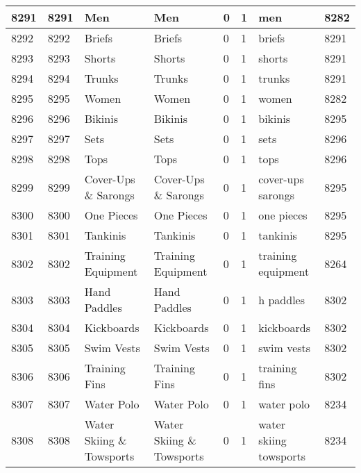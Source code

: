\begin{longtable}{|l|l|l|l|l|l|l|l|}
8291 & 8291 & Men & Men & 0 & 1 & men & 8282 \\ \hline 
8292 & 8292 & Briefs & Briefs & 0 & 1 & briefs & 8291 \\ \hline 
8293 & 8293 & Shorts & Shorts & 0 & 1 & shorts & 8291 \\ \hline 
8294 & 8294 & Trunks & Trunks & 0 & 1 & trunks & 8291 \\ \hline 
8295 & 8295 & Women & Women & 0 & 1 & women & 8282 \\ \hline 
8296 & 8296 & Bikinis & Bikinis & 0 & 1 & bikinis & 8295 \\ \hline 
8297 & 8297 & Sets & Sets & 0 & 1 & sets & 8296 \\ \hline 
8298 & 8298 & Tops & Tops & 0 & 1 & tops & 8296 \\ \hline 
8299 & 8299 & Cover-Ups \& Sarongs & Cover-Ups \& Sarongs & 0 & 1 & cover-ups sarongs & 8295 \\ \hline 
8300 & 8300 & One Pieces & One Pieces & 0 & 1 & one pieces & 8295 \\ \hline 
8301 & 8301 & Tankinis & Tankinis & 0 & 1 & tankinis & 8295 \\ \hline 
8302 & 8302 & Training Equipment & Training Equipment & 0 & 1 & training equipment & 8264 \\ \hline 
8303 & 8303 & Hand Paddles & Hand Paddles & 0 & 1 & h paddles & 8302 \\ \hline 
8304 & 8304 & Kickboards & Kickboards & 0 & 1 & kickboards & 8302 \\ \hline 
8305 & 8305 & Swim Vests & Swim Vests & 0 & 1 & swim vests & 8302 \\ \hline 
8306 & 8306 & Training Fins & Training Fins & 0 & 1 & training fins & 8302 \\ \hline 
8307 & 8307 & Water Polo & Water Polo & 0 & 1 & water polo & 8234 \\ \hline 
8308 & 8308 & Water Skiing \& Towsports & Water Skiing \& Towsports & 0 & 1 & water skiing towsports & 8234 \\ \hline 
 \end{longtable}
